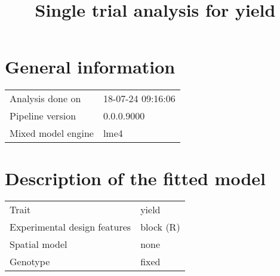 \documentclass[a4paper,11pt]{article}\usepackage[]{graphicx}\usepackage[]{color}
\title{Single trial analysis for yield}%
\author{\vspace{-5ex}}
\date{\vspace{-5ex}}
\begin{document}
\maketitle

\singlespacing

\section{General information}
\begin{table}[ht]
\begin{flushleft}
\begin{tabular}{ll}
  Analysis done on & 18-07-24 09:16:06 \\ 
  Pipeline version & 0.0.0.9000 \\ 
  Mixed model engine & lme4 \\ 
  \end{tabular}
\label{general}
\end{flushleft}
\end{table}


\section{Description of the fitted model}

\begin{table}[ht]
\begin{flushleft}
\begin{tabular}{ll}
  Trait & yield \\ 
  Experimental design features & block (R) \\ 
  Spatial model & none \\ 
  Genotype & fixed \\ 
  \end{tabular}
\label{modelDescription}
\end{flushleft}
\end{table}

\newpage
\end{document}
